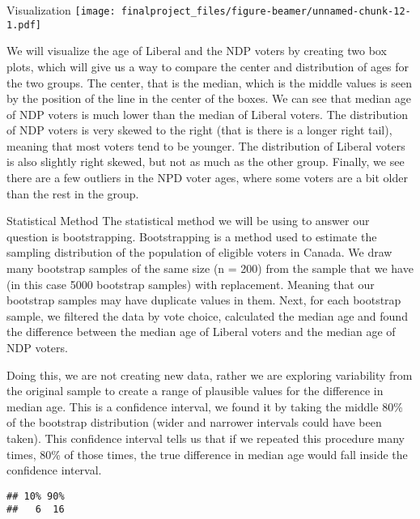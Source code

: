 \documentclass[
  9pt,
  ignorenonframetext,
]{beamer}
\begin{document}
\begin{frame}
\begin{block}{Visualization}
\protect\hypertarget{visualization-2}{}
\texttt{[image: finalproject\_files/figure-beamer/unnamed-chunk-12-1.pdf]}

We will visualize the age of Liberal and the NDP voters by creating two
box plots, which will give us a way to compare the center and
distribution of ages for the two groups. The center, that is the median,
which is the middle values is seen by the position of the line in the
center of the boxes. We can see that median age of NDP voters is much
lower than the median of Liberal voters. The distribution of NDP voters
is very skewed to the right (that is there is a longer right tail),
meaning that most voters tend to be younger. The distribution of Liberal
voters is also slightly right skewed, but not as much as the other
group. Finally, we see there are a few outliers in the NPD voter ages,
where some voters are a bit older than the rest in the group.
\end{block}
\end{frame}

\begin{frame}[fragile]
\begin{block}{Statistical Method}
\protect\hypertarget{statistical-method}{}
The statistical method we will be using to answer our question is
bootstrapping. Bootstrapping is a method used to estimate the sampling
distribution of the population of eligible voters in Canada. We draw
many bootstrap samples of the same size (n = 200) from the sample that
we have (in this case 5000 bootstrap samples) with replacement. Meaning
that our bootstrap samples may have duplicate values in them. Next, for
each bootstrap sample, we filtered the data by vote choice, calculated
the median age and found the difference between the median age of
Liberal voters and the median age of NDP voters.

Doing this, we are not creating new data, rather we are exploring
variability from the original sample to create a range of plausible
values for the difference in median age. This is a confidence interval,
we found it by taking the middle 80\% of the bootstrap distribution
(wider and narrower intervals could have been taken). This confidence
interval tells us that if we repeated this procedure many times, 80\% of
those times, the true difference in median age would fall inside the
confidence interval.

\begin{verbatim}
## 10% 90% 
##   6  16
\end{verbatim}
\end{block}
\end{frame}
\end{document}
